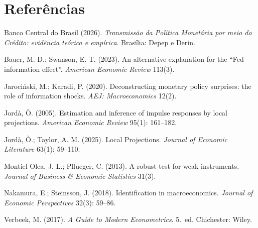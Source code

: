 \documentclass[11pt,a4paper]{article}
\begin{document}
\section*{Referências}
\small
\begin{description}\setlength{\itemsep}{0.2em}
\item Banco Central do Brasil (2026). \emph{Transmissão da Política Monetária por meio do Crédito:
  evidência teórica e empírica}. Brasília: Depep e Derin.
\item Bauer, M. D.; Swanson, E. T. (2023). An alternative explanation for the ``Fed information effect''. \emph{American Economic Review} 113(3).
\item Jarociński, M.; Karadi, P. (2020). Deconstructing monetary policy surprises: the role of information shocks. \emph{AEJ: Macroeconomics} 12(2).
\item Jordà, Ò. (2005). Estimation and inference of impulse responses by local projections. \emph{American Economic Review} 95(1): 161--182.
\item Jordà, Ò.; Taylor, A. M. (2025). Local Projections. \emph{Journal of Economic Literature} 63(1): 59--110.
\item Montiel Olea, J. L.; Pflueger, C. (2013). A robust test for weak instruments. \emph{Journal of Business \& Economic Statistics} 31(3).
\item Nakamura, E.; Steinsson, J. (2018). Identification in macroeconomics. \emph{Journal of Economic Perspectives} 32(3): 59--86.
\item Verbeek, M. (2017). \emph{A Guide to Modern Econometrics}. 5.~ed. Chichester: Wiley.
\end{description}
\end{document}
